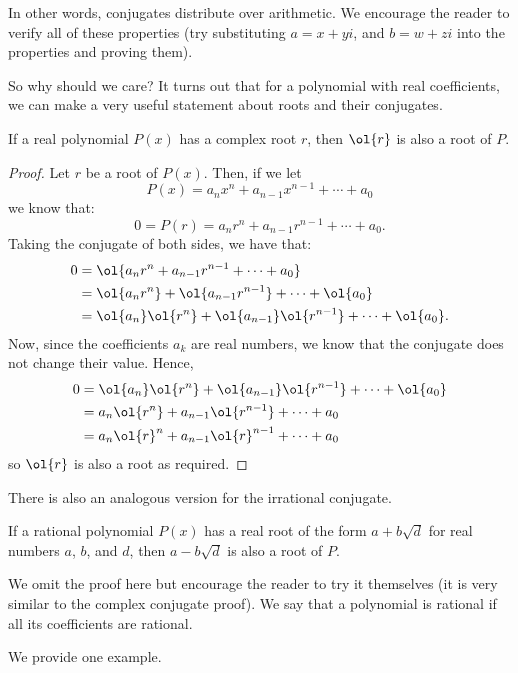 \documentclass[11pt]{scrartcl}
\begin{document}
In other words, conjugates distribute over arithmetic. We encourage the reader to verify all of these properties (try substituting $a = x+yi$, and $b =w+zi$ into the properties and proving them).

So why should we care? It turns out that for a polynomial with real coefficients, we can make a very useful statement about roots and their conjugates.

\begin{theorem*}
If a real polynomial $P(x)$ has a complex root $r$, then $\ol{r}$ is also a root of $P$.
\end{theorem*}
\begin{proof}
Let $r$ be a root of $P(x)$. Then, if we let \[P(x) = a_nx^n+a_{n-1}x^{n-1}+\cdots+a_0\] we know that: \[0 = P(r) = a_nr^n+a_{n-1}r^{n-1}+\cdots+a_0.\] Taking the conjugate of both sides, we have that:
\begin{align*}
0 &= \ol{a_nr^n+a_{n-1}r^{n-1}+\cdots+a_0} \\
&= \ol{a_nr^n}+\ol{a_{n-1}r^{n-1}}+\cdots+\ol{a_0} \\
&= \ol{a_n}\ol{r^n}+\ol{a_{n-1}}\ol{r^{n-1}}+\cdots+\ol{a_0}.
\end{align*}
Now, since the coefficients $a_k$ are real numbers, we know that the conjugate does not change their value. Hence,
\begin{align*}
0 &= \ol{a_n}\ol{r^n}+\ol{a_{n-1}}\ol{r^{n-1}}+\cdots+\ol{a_0} \\
&= a_n\ol{r^n}+a_{n-1}\ol{r^{n-1}}+\cdots+a_0 \\
&= a_n\ol{r}^n+a_{n-1}\ol{r}^{n-1}+\cdots+a_0
\end{align*}
so $\ol{r}$ is also a root as required.
\end{proof}

There is also an analogous version for the irrational conjugate.

\begin{theorem*}
If a rational polynomial $P(x)$ has a real root of the form $a+b\sqrt{d}$ for real numbers $a$, $b$, and $d$, then $a-b\sqrt{d}$ is also a root of $P$.
\end{theorem*}

We omit the proof here but encourage the reader to try it themselves (it is very similar to the complex conjugate proof). We say that a polynomial is rational if all its coefficients are rational.

We provide one example.
\end{document}
